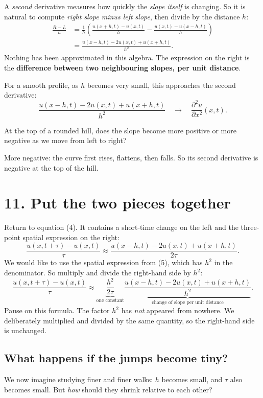 \documentclass[11pt,a4paper]{article}
\newcommand{\ans}[1]{\par\vspace{4pt}{\small\color{blue}\textbf{Answer.}}\enspace #1}
\begin{document}
A \emph{second} derivative measures how quickly the \emph{slope itself} is changing. So it is natural to compute \emph{right slope minus left slope}, then divide by the distance $h$:
\[
\begin{aligned}
\frac{R-L}{h}
&=\frac{1}{h}\left(\frac{u(x+h,t)-u(x,t)}{h}
-\frac{u(x,t)-u(x-h,t)}{h}\right)\\[5pt]
&=\boxed{\displaystyle\frac{u(x-h,t)-2u(x,t)+u(x+h,t)}{h^2}.}
\end{aligned}
\]
Nothing has been approximated in this algebra. The expression on the right is the \textbf{difference between two neighbouring slopes, per unit distance}.

For a smooth profile, as $h$ becomes very small, this approaches the second derivative:
\[
\boxed{\displaystyle
\frac{u(x-h,t)-2u(x,t)+u(x+h,t)}{h^2}
\quad\longrightarrow\quad
\frac{\partial^2u}{\partial x^2}(x,t).}
\tag{5}
\]
\begin{think}
At the top of a rounded hill, does the slope become more positive or more negative as we move from left to right?
\ans{More negative: the curve first rises, flattens, then falls. So its second derivative is negative at the top of the hill.}
\end{think}

\newpage
\section{11. Put the two pieces together}
Return to equation (4). It contains a short-time change on the left and the three-point spatial expression on the right:
\[
\frac{u(x,t+\tau)-u(x,t)}{\tau}
\approx
\frac{u(x-h,t)-2u(x,t)+u(x+h,t)}{2\tau}.
\]
We would like to use the spatial expression from (5), which has $h^2$ in the denominator. So multiply and divide the right-hand side by $h^2$:
\[
\boxed{\displaystyle
\frac{u(x,t+\tau)-u(x,t)}{\tau}
\approx
\underbrace{\frac{h^2}{2\tau}}_{\text{one constant}}
\underbrace{\frac{u(x-h,t)-2u(x,t)+u(x+h,t)}{h^2}}_{\text{change of slope per unit distance}}.}
\tag{6}
\]
Pause on this formula. The factor $h^2$ has \emph{not} appeared from nowhere. We deliberately multiplied and divided by the same quantity, so the right-hand side is unchanged.

\subsection*{What happens if the jumps become tiny?}
We now imagine studying finer and finer walks: $h$ becomes small, and $\tau$ also becomes small. But \emph{how} should they shrink relative to each other?
\end{document}
